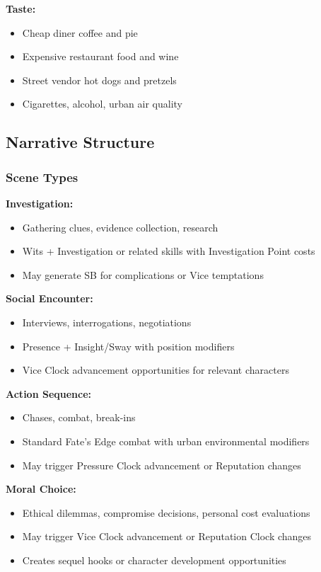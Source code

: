 \documentclass[11pt]{article}
\begin{document}
\textbf{Taste:}
\begin{itemize}
\item Cheap diner coffee and pie
\item Expensive restaurant food and wine
\item Street vendor hot dogs and pretzels
\item Cigarettes, alcohol, urban air quality
\end{itemize}

\subsection{Narrative Structure}

\subsubsection{Scene Types}

\textbf{Investigation:}
\begin{itemize}
\item Gathering clues, evidence collection, research
\item Wits + Investigation or related skills with Investigation Point costs
\item May generate SB for complications or Vice temptations
\end{itemize}

\textbf{Social Encounter:}
\begin{itemize}
\item Interviews, interrogations, negotiations
\item Presence + Insight/Sway with position modifiers
\item Vice Clock advancement opportunities for relevant characters
\end{itemize}

\textbf{Action Sequence:}
\begin{itemize}
\item Chases, combat, break-ins
\item Standard Fate's Edge combat with urban environmental modifiers
\item May trigger Pressure Clock advancement or Reputation changes
\end{itemize}

\textbf{Moral Choice:}
\begin{itemize}
\item Ethical dilemmas, compromise decisions, personal cost evaluations
\item May trigger Vice Clock advancement or Reputation Clock changes
\item Creates sequel hooks or character development opportunities
\end{itemize}
\end{document}
